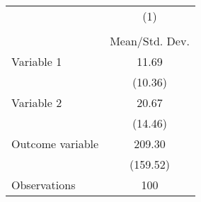 {
\def\sym#1{\ifmmode^{#1}\else\(^{#1}\)\fi}
\begin{tabular}{l*{1}{c}}
\hline\hline
                    &\multicolumn{1}{c}{(1)}\\
                    &\multicolumn{1}{c}{}\\
                    &Mean/Std. Dev.\\
\hline
Variable 1          &       11.69\\
                    &     (10.36)\\
Variable 2          &       20.67\\
                    &     (14.46)\\
Outcome variable    &      209.30\\
                    &    (159.52)\\
\hline
Observations        &         100\\
\hline\hline
\end{tabular}
}
